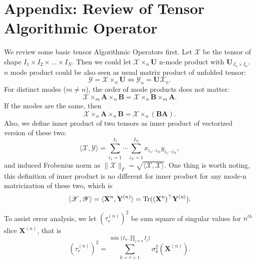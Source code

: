 \section{Appendix: Review of Tensor Algorithmic Operator}
\label{sec:review_tensor}
We review some basic tensor Algorithmic Operators first. Let $\mathscr{X}$ be the tensor of shape $I_1\times I_2\times \dots \times I_N$. Then we could let $\mathscr{X}\times_n  \mathbf{U}$ n-mode product with $\mathbf{U}_{J_n\times I_n}$. $n$ mode product could be also seen as usual matrix product of unfolded tensor:
\begin{equation}
\mathscr{Y} = \mathscr{X}\times_n \mathbf{U} \Longleftrightarrow 
\mathscr{Y}_n = \mathbf{U} \mathscr{X}_n. 
\end{equation}
For distinct modes ($m\neq n$), the order of mode products does not matter:
\begin{equation}
\label{eq: tensor_product_mul_exchangable}
\mathscr{X}\times_m \mathbf{A} \times_n \mathbf{B} =    \mathscr{X}\times_n \mathbf{B} \times_m \mathbf{A}. 
\end{equation}
If the modes are the same, then 
\begin{equation}
\label{eq: tensor_product_association}
\mathscr{X}\times_n \mathbf{A} \times_n \mathbf{B} =    \mathscr{X}\times_n (\mathbf{BA}). 
\end{equation}
Also, we define inner product of two tensors as inner product of vectorized version of these two:
\begin{equation}
\langle \mathscr{X}, \mathscr{Y}\rangle = \sum_{i_1=1}^{I_1}\cdots \sum_{i_N=1}^{I_N} x_{i_1\cdots i_N}y_{i_1\cdots i_N},
\end{equation}
and induced Frobenius norm as $\|\mathscr{X}\|_F = \sqrt{\langle \mathscr{X}, \mathscr{X} \rangle}$. One thing is worth noting, this definition of inner product is no different for inner product for any mode-n matricization of these two, which is 
\begin{equation}
\langle \mathscr{X}, \mathscr{Y}\rangle = \langle \mathbf{X}^{n}, \mathbf{Y}^{(n)}\rangle = \rm{Tr}((\mathbf{X}^{n})^\top \mathbf{Y}^{(n)}). 
\end{equation}

\par 
To assist error analysis,  we let $(\tau^{(n)}_{r})^2$ be sum square of singular values for $n^{th}$ slice $\mathbf{X}^{(n)}$, that is 
\begin{equation}
(\tau^{(n)}_r)^2 = \sum_{k=r+1}^{\min\{I_n, \prod_{j\neq n} I_j\}} \sigma^2_k(\mathbf{X}^{(n)}).
\end{equation}
